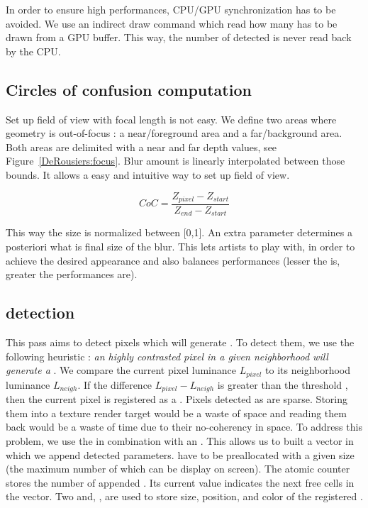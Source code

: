 In order to ensure high performances, CPU/GPU synchronization has to be avoided. We use an indirect draw command which read how many \bokeh has to be drawn from a GPU buffer. This way, the number of detected \bokehs is never read back by the CPU.

\subsection{Circles of confusion computation}
Set up field of view with focal length is not easy. We define two areas where geometry is out-of-focus : a near/foreground area and a far/background area. Both areas are delimited with a near and far depth values, see Figure~\ref{DeRousiers:focus}. Blur amount is linearly interpolated between those bounds. It allows a easy and intuitive way to set up field of view.

$$
	CoC = \frac{Z_{pixel} - Z_{start} }{ Z_{end} - Z_{start} }
$$

This way the \coc size is normalized between [0,1]. An extra parameter  determines a posteriori what is final size of the blur. This lets artists to play with, in order to achieve the desired appearance and also balances performances (lesser the  is, greater the performances are).


\subsection{\Bokeh detection}
This pass aims to detect pixels which will generate \bokehs. To detect them, we use the following heuristic : \emph{an highly contrasted pixel in a given neighborhood will generate a \bokeh}. We compare the current pixel luminance $L_{pixel}$ to its neighborhood luminance $L_{neigh}$. If the difference $L_{pixel}-L_{neigh}$ is greater than the threshold , then the current pixel is registered as a \bokeh. Pixels detected as \bokeh are sparse. Storing them into a texture render target would be a waste of space and reading them back would be a waste of time due to their no-coherency in space. To address this problem, we use the \opengl {} in combination with an . This allows us to built a vector in which we append detected \bokehs parameters.  have to be preallocated with a given size (\ie the maximum number of \bokehs which can be display on screen). The atomic counter  stores the number of appended \bokehs. Its current value indicates the next free cells in the  vector. Two   and, , are used to store \coc size, position, and color of the registered \bokehs. 


